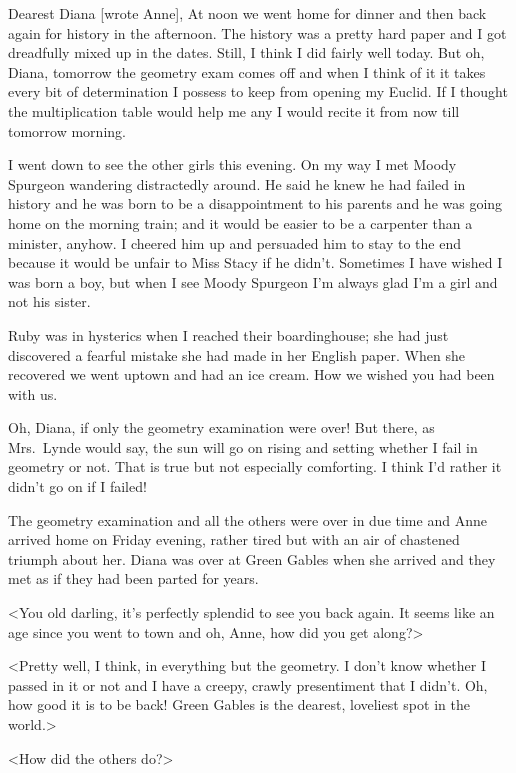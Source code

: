 \begin{mail}{}{Dearest Diana [wrote Anne],}
At noon we went home for dinner and then back again for history in the afternoon. The history was a pretty hard paper and I got dreadfully mixed up in the dates. Still, I think I did fairly well today. But oh, Diana, tomorrow the geometry exam comes off and when I think of it it takes every bit of determination I possess to keep from opening my Euclid. If I thought the multiplication table would help me any I would recite it from now till tomorrow morning.

I went down to see the other girls this evening. On my way I met Moody Spurgeon wandering distractedly around. He said he knew he had failed in history and he was born to be a disappointment to his parents and he was going home on the morning train; and it would be easier to be a carpenter than a minister, anyhow. I cheered him up and persuaded him to stay to the end because it would be unfair to Miss Stacy if he didn't. Sometimes I have wished I was born a boy, but when I see Moody Spurgeon I'm always glad I'm a girl and not his sister.

Ruby was in hysterics when I reached their boardinghouse; she had just discovered a fearful mistake she had made in her English paper. When she recovered we went uptown and had an ice cream. How we wished you had been with us.

Oh, Diana, if only the geometry examination were over! But there, as Mrs.~Lynde would say, the sun will go on rising and setting whether I fail in geometry or not. That is true but not especially comforting. I think I'd rather it didn't go on if I failed!

\end{mail}

The geometry examination and all the others were over in due time and Anne arrived home on Friday evening, rather tired but with an air of chastened triumph about her. Diana was over at Green Gables when she arrived and they met as if they had been parted for years.

<You old darling, it's perfectly splendid to see you back again. It seems like an age since you went to town and oh, Anne, how did you get along?>

<Pretty well, I think, in everything but the geometry. I don't know whether I passed in it or not and I have a creepy, crawly presentiment that I didn't. Oh, how good it is to be back! Green Gables is the dearest, loveliest spot in the world.>

<How did the others do?>

